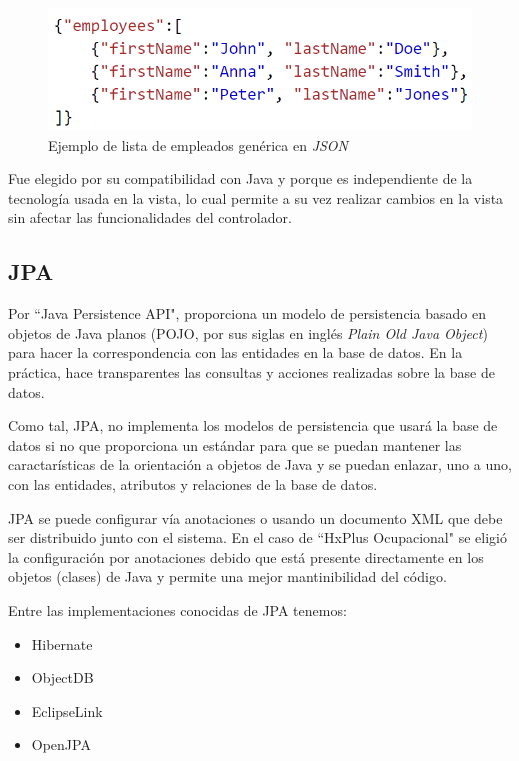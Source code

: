         \begin{figure}[htbp!]
            \begin{center}
                \includegraphics[width=.8\textwidth]{figures/jsonejemplo}
            \end{center}
            \caption{Ejemplo de lista de empleados genérica en \textit{JSON}}
            \label{json-ejemplo}
        \end{figure}
        
        Fue elegido por su compatibilidad con Java y porque es independiente de la tecnología usada en la vista, lo cual permite a su vez realizar cambios en la vista sin afectar las funcionalidades del controlador.
        
        \subsection{JPA}
        \label{tecno-jpa}
        
        Por ``Java Persistence API", proporciona un modelo de persistencia basado en objetos de Java planos (POJO, por sus siglas en inglés \textit{Plain Old Java Object}) para hacer la correspondencia con las entidades en la base de datos\cite{JPA-definicion}. En la práctica, hace transparentes las consultas y acciones realizadas sobre la base de datos.
        
        Como tal, JPA, no implementa los modelos de persistencia que usará la base de datos si no que proporciona un estándar para que se puedan mantener las caractarísticas de la orientación a objetos de Java y se puedan enlazar, uno a uno, con las entidades, atributos y relaciones de la base de datos.
        
        JPA se puede configurar vía anotaciones o usando un documento XML que debe ser distribuido junto con el sistema. En el caso de ``HxPlus Ocupacional" se eligió la configuración por anotaciones debido que está presente directamente en los objetos (clases) de Java y permite una mejor mantinibilidad del código.
        
        Entre las implementaciones conocidas de JPA tenemos:
        \begin{itemize}
             \item Hibernate
             \item ObjectDB
             \item EclipseLink
             \item OpenJPA
        \end{itemize}
        
